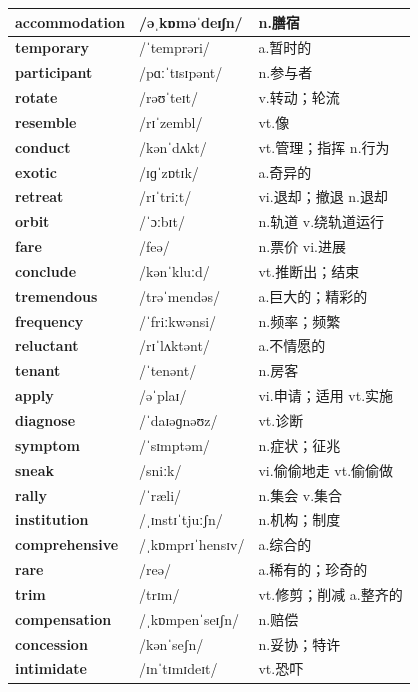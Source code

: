 \documentclass[14pt,a4paper]{extarticle}
\begin{document}
\begin{longtable}{ p{} p{} p{} }
\textbf{accommodation} & /əˌkɒməˈdeɪʃn/ & n.膳宿 \\ \hline
\textbf{temporary} & /ˈtemprəri/ & a.暂时的 \\ \hline
\textbf{participant} & /pɑːˈtɪsɪpənt/ & n.参与者 \\ \hline
\textbf{rotate} & /rəʊˈteɪt/ & v.转动；轮流 \\ \hline
\textbf{resemble} & /rɪˈzembl/ & vt.像 \\ \hline
\textbf{conduct} & /kənˈdʌkt/ & vt.管理；指挥 \quad n.行为 \\ \hline
\textbf{exotic} & /ɪɡˈzɒtɪk/ & a.奇异的 \\ \hline
\textbf{retreat} & /rɪˈtriːt/ & vi.退却；撤退 \quad n.退却 \\ \hline
\textbf{orbit} & /ˈɔːbɪt/ & n.轨道 \quad v.绕轨道运行 \\ \hline
\textbf{fare} & /feə/ & n.票价 \quad vi.进展 \\ \hline
\textbf{conclude} & /kənˈkluːd/ & vt.推断出；结束 \\ \hline
\textbf{tremendous} & /trəˈmendəs/ & a.巨大的；精彩的 \\ \hline
\textbf{frequency} & /ˈfriːkwənsi/ & n.频率；频繁 \\ \hline
\textbf{reluctant} & /rɪˈlʌktənt/ & a.不情愿的 \\ \hline
\textbf{tenant} & /ˈtenənt/ & n.房客 \\ \hline
\textbf{apply} & /əˈplaɪ/ & vi.申请；适用 \quad vt.实施 \\ \hline
\textbf{diagnose} & /ˈdaɪəɡnəʊz/ & vt.诊断 \\ \hline
\textbf{symptom} & /ˈsɪmptəm/ & n.症状；征兆 \\ \hline
\textbf{sneak} & /sniːk/ & vi.偷偷地走 \quad vt.偷偷做 \\ \hline
\textbf{rally} & /ˈræli/ & n.集会 \quad v.集合 \\ \hline
\textbf{institution} & /ˌɪnstɪˈtjuːʃn/ & n.机构；制度 \\ \hline
\textbf{comprehensive} & /ˌkɒmprɪˈhensɪv/ & a.综合的 \\ \hline
\textbf{rare} & /reə/ & a.稀有的；珍奇的 \\ \hline
\textbf{trim} & /trɪm/ & vt.修剪；削减 \quad a.整齐的 \\ \hline
\textbf{compensation} & /ˌkɒmpenˈseɪʃn/ & n.赔偿 \\ \hline
\textbf{concession} & /kənˈseʃn/ & n.妥协；特许 \\ \hline
\textbf{intimidate} & /ɪnˈtɪmɪdeɪt/ & vt.恐吓 \\ \hline

\end{longtable}
\end{document}
